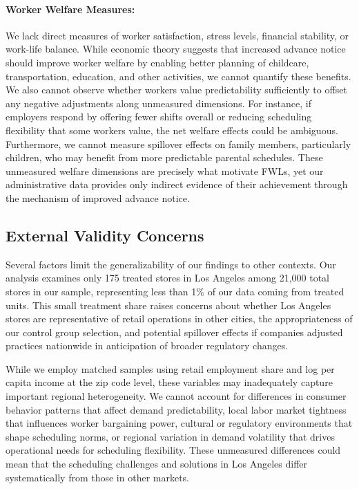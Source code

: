 \documentclass[letterpaper,11pt,leqno]{article}
\theoremstyle{paper}
\begin{document}
\paragraph{Worker Welfare Measures:} We lack direct measures of worker satisfaction, stress levels, financial stability, or work-life balance. While economic theory suggests that increased advance notice should improve worker welfare by enabling better planning of childcare, transportation, education, and other activities, we cannot quantify these benefits. We also cannot observe whether workers value predictability sufficiently to offset any negative adjustments along unmeasured dimensions. For instance, if employers respond by offering fewer shifts overall or reducing scheduling flexibility that some workers value, the net welfare effects could be ambiguous. Furthermore, we cannot measure spillover effects on family members, particularly children, who may benefit from more predictable parental schedules. These unmeasured welfare dimensions are precisely what motivate FWLs, yet our administrative data provides only indirect evidence of their achievement through the mechanism of improved advance notice.

\subsection{External Validity Concerns}

Several factors limit the generalizability of our findings to other contexts. Our analysis examines only 175 treated stores in Los Angeles among 21,000 total stores in our sample, representing less than 1\% of our data coming from treated units. This small treatment share raises concerns about whether Los Angeles stores are representative of retail operations in other cities, the appropriateness of our control group selection, and potential spillover effects if companies adjusted practices nationwide in anticipation of broader regulatory changes.

While we employ matched samples using retail employment share and log per capita income at the zip code level, these variables may inadequately capture important regional heterogeneity. We cannot account for differences in consumer behavior patterns that affect demand predictability, local labor market tightness that influences worker bargaining power, cultural or regulatory environments that shape scheduling norms, or regional variation in demand volatility that drives operational needs for scheduling flexibility. These unmeasured differences could mean that the scheduling challenges and solutions in Los Angeles differ systematically from those in other markets.
\end{document}
